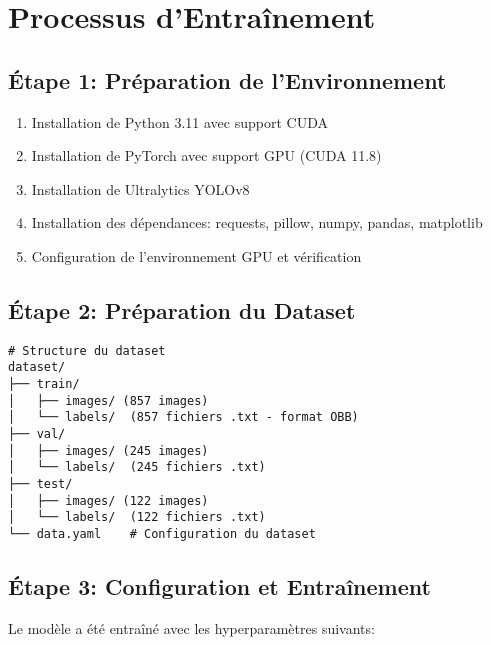 \documentclass[a4paper,12pt]{report}
\begin{document}
\section{Processus d'Entraînement}

\subsection{Étape 1: Préparation de l'Environnement}

\begin{enumerate}
    \item Installation de Python 3.11 avec support CUDA
    \item Installation de PyTorch avec support GPU (CUDA 11.8)
    \item Installation de Ultralytics YOLOv8
    \item Installation des dépendances: requests, pillow, numpy, pandas, matplotlib
    \item Configuration de l'environnement GPU et vérification
\end{enumerate}

\subsection{Étape 2: Préparation du Dataset}

\begin{lstlisting}
# Structure du dataset
dataset/
├── train/
│   ├── images/ (857 images)
│   └── labels/  (857 fichiers .txt - format OBB)
├── val/
│   ├── images/ (245 images)
│   └── labels/  (245 fichiers .txt)
├── test/
│   ├── images/ (122 images)
│   └── labels/  (122 fichiers .txt)
└── data.yaml    # Configuration du dataset
\end{lstlisting}

\subsection{Étape 3: Configuration et Entraînement}

Le modèle a été entraîné avec les hyperparamètres suivants:
\end{document}
